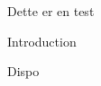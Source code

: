 \documentclass[12pt]{article}
\begin{document}
Dette er en test 

{Introduction}

{Dispo}
\end{document}
